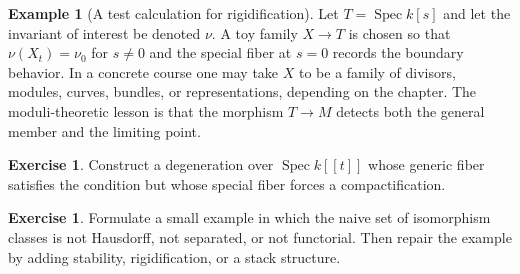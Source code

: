 \documentclass[11pt]{amsart}
\theoremstyle{definition}
\newtheorem{example}[theorem]{Example}
\newtheorem{exercise}[theorem]{Exercise}
\newcommand{\Spec}{\operatorname{Spec}}
\begin{document}
\begin{example}[A test calculation for rigidification]
Let $T=\Spec k[s]$ and let the invariant of interest be denoted $\nu$.  A toy family $X\to T$ is chosen so that $\nu(X_t)=\nu_0$ for $s\ne0$ and the special fiber at $s=0$ records the boundary behavior.  In a concrete course one may take $X$ to be a family of divisors, modules, curves, bundles, or representations, depending on the chapter.  The moduli-theoretic lesson is that the morphism $T\to M$ detects both the general member and the limiting point.
\end{example}
\begin{exercise}
Construct a degeneration over $\Spec k[[t]]$ whose generic fiber satisfies the condition but whose special fiber forces a compactification.
\end{exercise}
\begin{exercise}
Formulate a small example in which the naive set of isomorphism classes is not Hausdorff, not separated, or not functorial.  Then repair the example by adding stability, rigidification, or a stack structure.
\end{exercise}
\clearpage
\end{document}

